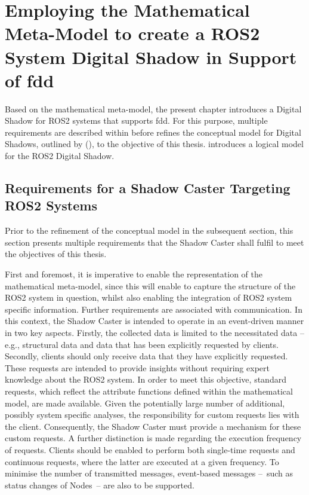 \cleardoublepage
{}
\chapter{Employing the Mathematical Meta-Model to create a ROS2 System Digital Shadow in Support of \acl{fdd}} \label{chap:dshadow}

Based on the mathematical meta-model, the present chapter introduces a Digital Shadow for ROS2 systems that supports \acl{fdd}. For this purpose, multiple requirements are described within  before  refines the conceptual model for Digital Shadows, outlined by \Textcite{DSConceptualModelSpringer} (), to the objective of this thesis.  introduces a logical model for the ROS2 Digital Shadow.


    \section{Requirements for a Shadow Caster Targeting ROS2 Systems} \label{sec:dshadow:requirements}
    Prior to the refinement of the conceptual model in the subsequent section, this section presents multiple requirements that the Shadow Caster shall fulfil to meet the objectives of this thesis.

    First and foremost, it is imperative to enable the representation of the mathematical meta-model, since this will enable to capture the structure of the ROS2 system in question, whilst also enabling the integration of ROS2 system specific information.\newline
    Further requirements are associated with communication. In this context, the Shadow Caster is intended to operate in an event-driven manner in two key aspects. Firstly, the collected data is limited to the necessitated data -- e.g., structural data and data that has been explicitly requested by clients. Secondly, clients should only receive data that they have explicitly requested.\newline
    These requests are intended to provide insights without requiring expert knowledge about the ROS2 system. In order to meet this objective, standard requests, which reflect the attribute functions defined within the mathematical model, are made available. Given the potentially large number of additional, possibly system specific analyses, the responsibility for custom requests lies with the client. Consequently, the Shadow Caster must provide a mechanism for these custom requests.\newline
    A further distinction is made regarding the execution frequency of requests. Clients should be enabled to perform both single-time requests and continuous requests, where the latter are executed at a given frequency. To minimise the number of transmitted messages, event-based messages --~such as status changes of Nodes~-- are also to be supported.

